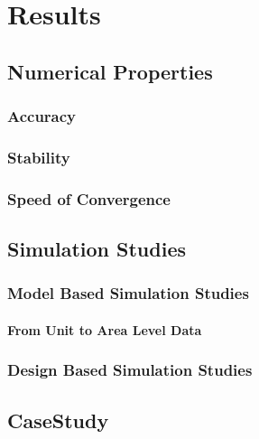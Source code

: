 
\part{Results}\label{part:results}

\chapter{Numerical Properties}
\section{Accuracy}
\section{Stability}
\section{Speed of Convergence}

\chapter{Simulation Studies}
\section{Model Based Simulation Studies}

\subsection{From Unit to Area Level Data}


\section{Design Based Simulation Studies}

\chapter{CaseStudy}


\appendix

